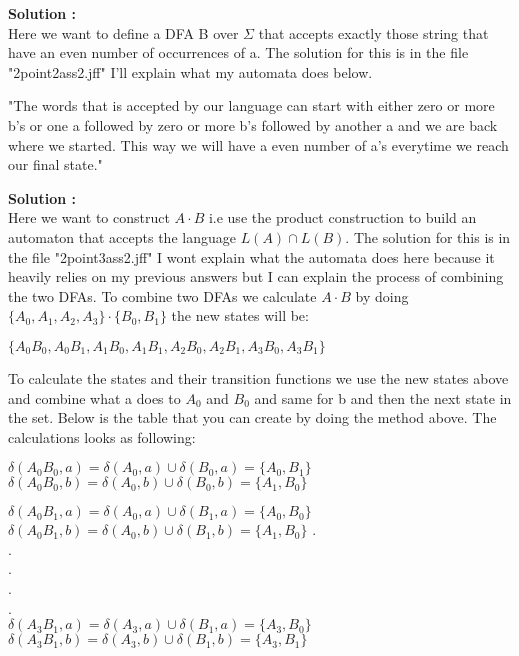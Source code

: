 \documentclass{article}
\newcounter{solution}
\newcommand\ASolution{%
  \stepcounter{solution}%
  \textbf{Solution \thesolution:}\\%
}
\begin{document}
\ASolution Here we want to define a DFA B over $\Sigma$ that 
accepts exactly those string that have an even number of 
occurrences of a. The solution for this is in the file 
"2point2ass2.jff" I'll explain what my automata does below.

\begin{center}
    "The words that is accepted by our language can start with 
    either zero or more b's or one a followed by zero or more 
    b's followed by another a and we are back where we started.
    This way we will have a even number of a's everytime we reach
    our final state." 
\end{center}
\newpage
\ASolution Here we want to construct $A \cdot B$ i.e use the product construction to 
build an automaton that accepts the language $L(A) \cap L(B)$. The solution for this 
is in the file "2point3ass2.jff" I wont explain what the automata does here because 
it heavily relies on my previous answers but I can explain the process of combining 
the two DFAs. To combine two DFAs we calculate $A \cdot B$ by doing 
$\{A_0,A_1,A_2,A_3\} \cdot \{B_0,B_1\}$ the new states will be:
\begin{center}
    $\{A_0B_0,A_0B_1,A_1B_0,A_1B_1,A_2B_0,A_2B_1,A_3B_0,A_3B_1\}$
\end{center}

To calculate the states and their transition functions we use the new states 
above and combine what a does to $A_0$ and $B_0$ and same for b and then the 
next state in the set. Below is the table that you can create by doing the 
method above. The calculations looks as following:

$\delta (A_0B_0, a) = \delta (A_0, a) \cup \delta (B_0, a) = \{A_0, B_1\}$ \newline
$\delta (A_0B_0, b) = \delta (A_0, b) \cup \delta (B_0, b) = \{A_1, B_0\}$

$\delta (A_0B_1, a) = \delta (A_0, a) \cup \delta (B_1, a) = \{A_0, B_0\}$ \newline
$\delta (A_0B_1, b) = \delta (A_0, b) \cup \delta (B_1, b) = \{A_1, B_0\}$
\hfill
. \\
. \\
. \\
. \\
. \\
$\delta (A_3B_1, a) = \delta (A_3, a) \cup \delta (B_1, a) = \{A_3, B_0\}$ \newline
$\delta (A_3B_1, b) = \delta (A_3, b) \cup \delta (B_1, b) = \{A_3, B_1\}$ \newline
\end{document}
